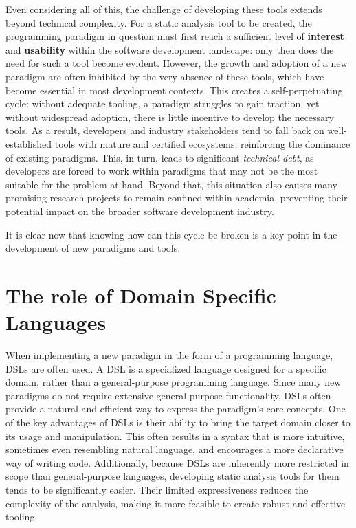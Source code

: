 \documentclass[12pt,a4paper,openright,twoside]{book}
\begin{document}
Even considering all of this, the challenge of developing these tools extends
beyond technical complexity. For a static analysis tool to be created, the
programming paradigm in question must first reach a sufficient level of
\textbf{interest} and \textbf{usability} within the software development
landscape: only then does the need for such a tool become evident. However, the
growth and adoption of a new paradigm are often inhibited by the very absence of
these tools, which have become essential in most development contexts. This
creates a self-perpetuating cycle: without adequate tooling, a paradigm
struggles to gain traction, yet without widespread adoption, there is little
incentive to develop the necessary tools.
%
As a result, developers and industry stakeholders tend to fall back on
well-established tools with mature and certified ecosystems, reinforcing the
dominance of existing paradigms. This, in turn, leads to significant
\emph{technical debt}, as developers are forced to work within paradigms that
may not be the most suitable for the problem at hand. Beyond that, this
situation also causes many promising research projects to remain confined within
academia, preventing their potential impact on the broader software development
industry. 

It is clear now that knowing how can this cycle be broken is a key point in 
the development of new paradigms and tools.

\section{The role of Domain Specific Languages} \label{sec:dsls}

When implementing a new paradigm in the form of a programming language,
\acp{DSL} are often used. A \ac{DSL} is a specialized language designed for a
specific domain, rather than a general-purpose programming language. Since many
new paradigms do not require extensive general-purpose functionality, \acp{DSL}
often provide a natural and efficient way to express the paradigm’s core
concepts.
%
One of the key advantages of \acp{DSL} is their ability to bring the target
domain closer to its usage and manipulation. This often results in a syntax that
is more intuitive, sometimes even resembling natural language, and encourages a
more declarative way of writing code. Additionally, because \acp{DSL} are
inherently more restricted in scope than general-purpose languages, developing
static analysis tools for them tends to be significantly easier. Their limited
expressiveness reduces the complexity of the analysis, making it more feasible
to create robust and effective tooling. 
\end{document}
